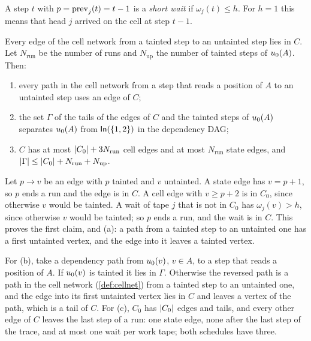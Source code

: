 A step $t$ with $p=\mathrm{prev}_j(t)=t-1$ is a \emph{short wait} if $\omega_j(t)\le h$. For $h=1$ this means that head $j$ arrived on the cell at
step $t-1$.

\begin{lemma}\label{lem:closure}
\notformalized
Every edge of the cell network from a tainted step to an untainted step lies in $C$. Let $N_{\mathrm{run}}$ be the number of runs and
$N_{\mathrm{up}}$ the number of tainted steps of $u_0(A)$. Then:
\begin{enumerate}[label=(\alph*)]
\item every path in the cell network from a step that reads a position of $A$ to an untainted step uses an edge of $C$;
\item the set $\Gamma$ of the tails of the edges of $C$ and the tainted steps of $u_0(A)$ separates $u_0(A)$ from $\mathsf{In}(\{1,2\})$
in the dependency DAG;
\item $C$ has at most $\lvert C_0 \rvert+3N_{\mathrm{run}}$ cell edges and at most $N_{\mathrm{run}}$ state edges, and
$\lvert \Gamma \rvert\le\lvert C_0 \rvert+N_{\mathrm{run}}+N_{\mathrm{up}}$.
\end{enumerate}
\end{lemma}

\begin{informalproof}
Let $p\to v$ be an edge with $p$ tainted and $v$ untainted. A state edge has $v=p+1$, so $p$ ends a run and the edge is in $C$. A cell
edge with $v\ge p+2$ is in $C_0$, since otherwise $v$ would be tainted. A wait of tape $j$ that is not in $C_0$ has $\omega_j(v)>h$,
since otherwise $v$ would be tainted; so $p$ ends a run, and the wait is in $C$. This proves the first claim, and (a): a path from a
tainted step to an untainted one has a first untainted vertex, and the edge into it leaves a tainted vertex.

For (b), take a dependency path from $u_0(v)$, $v\in A$, to a step that reads a position of $A$. If $u_0(v)$ is tainted it lies in
$\Gamma$. Otherwise the reversed path is a path in the cell network (\cref{def:cellnet}) from a tainted step to an untainted one, and
the edge into its first untainted vertex lies in $C$ and leaves a vertex of the path, which is a tail of $C$. For (c), $C_0$ has
$\lvert C_0 \rvert$ edges and tails, and every other edge of $C$ leaves the last step of a run: one state edge, none after the last step of
the trace, and at most one wait per work tape; both schedules have three.
\end{informalproof}

